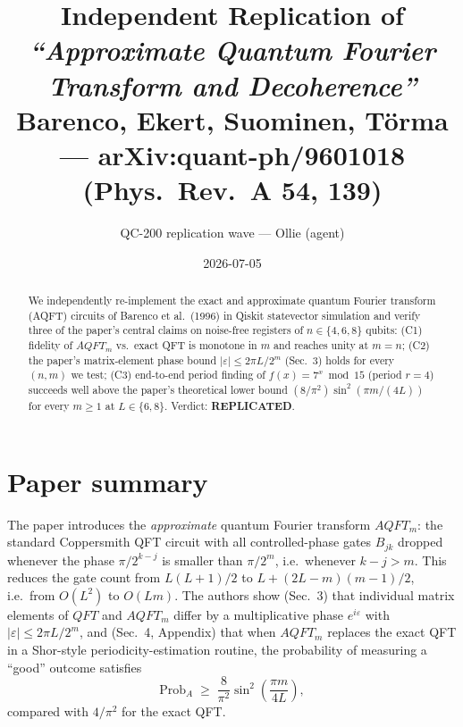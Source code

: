 \documentclass[11pt]{article}
\title{Independent Replication of\\
\emph{``Approximate Quantum Fourier Transform and Decoherence''}\\
\small Barenco, Ekert, Suominen, T\"orma --- arXiv:quant-ph/9601018 (Phys.\ Rev.\ A 54, 139)}
\author{QC-200 replication wave --- Ollie (agent)}
\date{2026-07-05}
\begin{document}
\maketitle

\begin{abstract}
We independently re-implement the exact and approximate quantum Fourier
transform (AQFT) circuits of Barenco et al.\ (1996) in Qiskit statevector
simulation and verify three of the paper's central claims on
noise-free registers of $n\in\{4,6,8\}$ qubits:
(C1) fidelity of $AQFT_m$ vs.\ exact QFT is monotone in $m$ and reaches unity
at $m=n$; (C2) the paper's matrix-element phase bound
$|\varepsilon|\le 2\pi L/2^m$ (Sec.~3) holds for every $(n,m)$ we test;
(C3) end-to-end period finding of $f(x)=7^x\bmod 15$ (period $r=4$)
succeeds well above the paper's theoretical lower bound
$(8/\pi^2)\sin^2(\pi m/(4L))$ for every $m\ge 1$ at $L\in\{6,8\}$.
Verdict: \textbf{REPLICATED}.
\end{abstract}

\section{Paper summary}
The paper introduces the \emph{approximate} quantum Fourier transform
$AQFT_m$: the standard Coppersmith QFT circuit with all controlled-phase
gates $B_{jk}$ dropped whenever the phase $\pi/2^{k-j}$ is smaller than
$\pi/2^m$, i.e.\ whenever $k-j > m$. This reduces the gate count from
$L(L+1)/2$ to $L + (2L-m)(m-1)/2$, i.e.\ from $O(L^2)$ to $O(Lm)$. The
authors show (Sec.~3) that individual matrix elements of $QFT$ and
$AQFT_m$ differ by a multiplicative phase $e^{i\varepsilon}$ with
$|\varepsilon|\le 2\pi L / 2^m$, and (Sec.~4, Appendix) that when
$AQFT_m$ replaces the exact QFT in a Shor-style periodicity-estimation
routine, the probability of measuring a ``good'' outcome satisfies
\begin{equation}
\text{Prob}_A \;\ge\; \frac{8}{\pi^2}\sin^2\!\left(\frac{\pi m}{4L}\right),
\label{eq:probA}
\end{equation}
compared with $4/\pi^2$ for the exact QFT.
\end{document}
